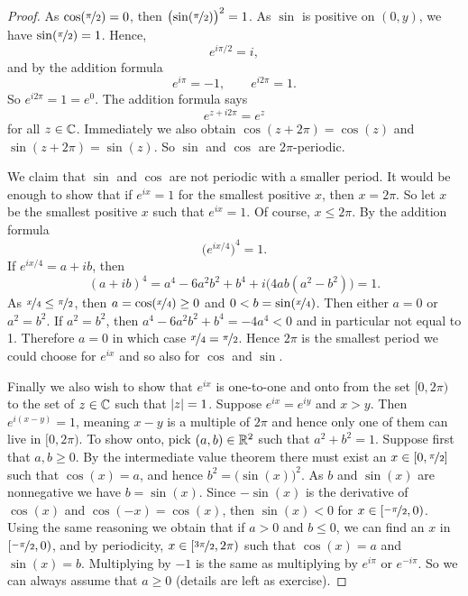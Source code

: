 \begin{proof}
As $\cos(\nicefrac{\pi}{2}) = 0$, then
${\bigl(\sin(\nicefrac{\pi}{2})\bigr)}^2 = 1$.
As $\sin$ is positive on $(0,y)$, we have
$\sin(\nicefrac{\pi}{2}) = 1$.
Hence,
\begin{equation*}
e^{i \pi /2} = i ,
\end{equation*}
and by the addition formula 
\begin{equation*}
e^{i \pi} = -1 ,
\qquad 
e^{i 2\pi} = 1 .
\end{equation*}
So $e^{i2\pi} = 1 = e^0$.  The addition formula says
\begin{equation*}
e^{z+i2\pi} = e^z
\end{equation*}
for all $z \in {\mathbb{C}}$.  Immediately we also obtain
$\cos(z+2\pi) = \cos(z)$ and $\sin(z+2\pi) = \sin(z)$.
So $\sin$ and $\cos$ are $2\pi$-periodic.

We claim that $\sin$ and $\cos$ are not periodic with a smaller period.  It
would be enough to show that if $e^{ix} = 1$ for the
smallest positive $x$, then
$x = 2\pi$.  So let $x$ be the smallest positive $x$ such that
$e^{ix} = 1$.
Of course, $x \leq 2\pi$.
By the addition formula
\begin{equation*}
{\bigl(e^{ix/4}\bigr)}^4 = 1 .
\end{equation*}
If $e^{ix/4} = a+ib$, then
\begin{equation*}
{(a+ib)}^4
=a^4-6a^2b^2+b^4 + i\bigl(4ab(a^2-b^2)\bigr)
=1 .
\end{equation*}
As $\nicefrac{x}{4} \leq \nicefrac{\pi}{2}$, then $a = \cos(\nicefrac{x}{4}) \geq 0$ and
$0 < b = \sin(\nicefrac{x}{4})$.  Then either $a = 0$ 
or $a^2 = b^2$.  If $a^2=b^2$, then
$a^4-6a^2b^2+b^4 = -4a^4 < 0$ and in particular not equal to 1.
Therefore $a=0$ in which case $\nicefrac{x}{4} = \nicefrac{\pi}{2}$.
Hence $2\pi$ is the smallest period we could choose for $e^{ix}$
and so also for $\cos$ and $\sin$.

Finally we also wish to show that $e^{ix}$ is one-to-one and onto
from the set $[0,2\pi)$ to the set of $z \in {\mathbb{C}}$ such that
$\lvert {z} \rvert = 1$.  Suppose $e^{ix} = e^{iy}$ and 
$x > y$.  Then
$e^{i(x-y)} = 1$, meaning $x-y$ is a multiple of $2\pi$ and hence
only one of them can live in $[0,2\pi)$.
To show onto, pick $(a,b) \in {\mathbb{R}}^2$ such that $a^2+b^2 = 1$.
Suppose first that $a,b \geq 0$.  By the intermediate value theorem
there must exist an $x \in [0,\nicefrac{\pi}{2}]$ such that
$\cos(x) = a$, and hence $b^2 = \bigl(\sin(x)\bigr)^2$.  As
$b$ and $\sin(x)$ are nonnegative we have $b = \sin(x)$.
Since $-\sin(x)$ is the derivative of $\cos(x)$
and $\cos(-x) = \cos(x)$, then $\sin(x) < 0$ for $x \in [\nicefrac{-\pi}{2},0)$.
Using the same reasoning we obtain that
if $a > 0$ and $b \leq 0$, we can find an $x$ in $[\nicefrac{-\pi}{2},0)$,
and by periodicity,
$x \in [\nicefrac{3\pi}{2},2\pi)$ such that $\cos(x) = a$ and $\sin(x)=b$.
Multiplying by $-1$ is the same as multiplying by $e^{i\pi}$ or
$e^{-i\pi}$.  So we can always assume that $a \geq 0$ (details are left
as exercise).
\end{proof}

